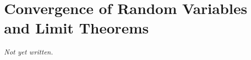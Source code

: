 \chapter{Convergence of Random Variables and Limit Theorems}\label{ch:limit-theorems}


\textit{Not yet written.}
